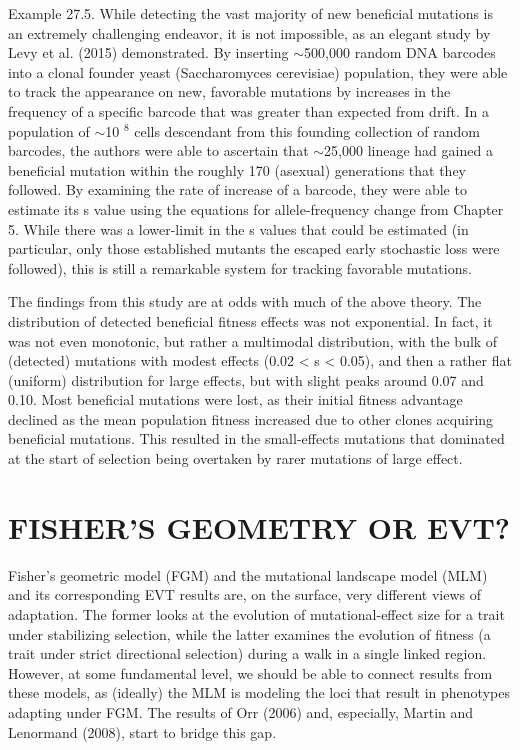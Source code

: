 \documentclass{article}
\begin{document}
Example 27.5. While detecting the vast majority of new beneficial mutations is an extremely challenging endeavor, it is not impossible, as an elegant study by Levy et al. (2015) demonstrated. By inserting  $ \sim $500,000 random DNA barcodes into a clonal founder yeast (Saccharomyces cerevisiae) population, they were able to track the appearance on new, favorable mutations by increases in the frequency of a specific barcode that was greater than expected from drift. In a population of  $ \sim $10 $ ^{8} $ cells descendant from this founding collection of random barcodes, the authors were able to ascertain that  $ \sim $25,000 lineage had gained a beneficial mutation within the roughly 170 (asexual) generations that they followed. By examining the rate of increase of a barcode, they were able to estimate its s value using the equations for allele-frequency change from Chapter 5. While there was a lower-limit in the s values that could be estimated (in particular, only those established mutants the escaped early stochastic loss were followed), this is still a remarkable system for tracking favorable mutations.

The findings from this study are at odds with much of the above theory. The distribution of detected beneficial fitness effects was not exponential. In fact, it was not even monotonic, but rather a multimodal distribution, with the bulk of (detected) mutations with modest effects (0.02 < s < 0.05), and then a rather flat (uniform) distribution for large effects, but with slight peaks around 0.07 and 0.10. Most beneficial mutations were lost, as their initial fitness advantage declined as the mean population fitness increased due to other clones acquiring beneficial mutations. This resulted in the small-effects mutations that dominated at the start of selection being overtaken by rarer mutations of large effect.

\section{FISHER'S GEOMETRY OR EVT?}
Fisher’s geometric model (FGM) and the mutational landscape model (MLM) and its corresponding EVT results are, on the surface, very different views of adaptation. The former looks at the evolution of mutational-effect size for a trait under stabilizing selection, while the latter examines the evolution of fitness (a trait under strict directional selection) during a walk in a single linked region. However, at some fundamental level, we should be able to connect results from these models, as (ideally) the MLM is modeling the loci that result in phenotypes adapting under FGM. The results of Orr (2006) and, especially, Martin and Lenormand (2008), start to bridge this gap.
\end{document}
